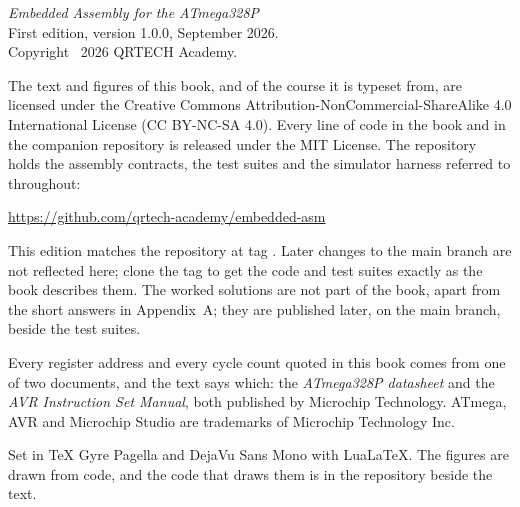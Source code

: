 \thispagestyle{empty}
\vspace*{\fill}
{\small
\noindent\textit{Embedded Assembly for the ATmega328P}\\
First edition, version 1.0.0, September 2026.\\
Copyright \textcopyright\ 2026 QRTECH Academy.

\medskip
\noindent The text and figures of this book, and of the course it is typeset from, are licensed
under the Creative Commons Attribution-NonCommercial-ShareAlike 4.0 International License
(CC BY-NC-SA 4.0). Every line of code in the book and in the companion repository is released
under the MIT License. The repository holds the assembly contracts, the test suites and the
simulator harness referred to throughout:

\medskip
\noindent\url{https://github.com/qrtech-academy/embedded-asm}

\medskip
\noindent This edition matches the repository at tag . Later changes to the main
branch are not reflected here; clone the tag to get the code and test suites exactly as the book
describes them. The worked solutions are not part of the book, apart from the short answers in
Appendix~A; they are published later, on the main branch, beside the test suites.

\medskip
\noindent Every register address and every cycle count quoted in this book comes from one of two
documents, and the text says which: the \emph{ATmega328P datasheet} and the \emph{AVR Instruction
Set Manual}, both published by Microchip Technology. ATmega, AVR and Microchip Studio are
trademarks of Microchip Technology Inc.

\medskip
\noindent Set in TeX Gyre Pagella and DejaVu Sans Mono with Lua\LaTeX. The figures are drawn
from code, and the code that draws them is in the repository beside the text.
\par}
\cleardoublepage
